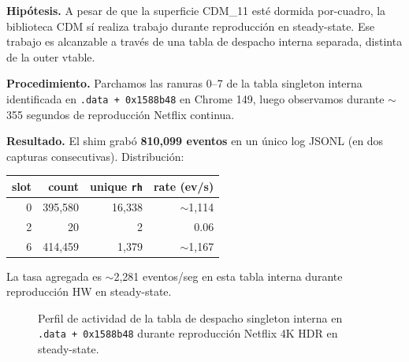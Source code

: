 \documentclass[11pt,letterpaper]{article}
\begin{document}
\textbf{Hipótesis.} A pesar de que la superficie CDM\_11 esté
dormida por-cuadro, la biblioteca CDM sí realiza trabajo durante
reproducción en steady-state. Ese trabajo es alcanzable a través
de una tabla de despacho interna separada, distinta de la outer
vtable.

\textbf{Procedimiento.} Parchamos las ranuras 0--7 de la tabla
singleton interna identificada en \texttt{.data + 0x1588b48} en
Chrome 149, luego observamos durante $\sim$355 segundos de
reproducción Netflix continua.

\textbf{Resultado.} El shim grabó \textbf{810{,}099 eventos} en un
único log JSONL (en dos capturas consecutivas). Distribución:

\begin{center}\small
\begin{tabular}{rrrr}
\toprule
\textbf{slot} & \textbf{count} & \textbf{unique \texttt{rh}} & \textbf{rate (ev/s)} \\
\midrule
0 & 395{,}580 & 16{,}338 & $\sim$1{,}114 \\
2 &     20    &  2     & 0.06 \\
6 & 414{,}459 & 1{,}379 & $\sim$1{,}167 \\
\bottomrule
\end{tabular}
\end{center}

\noindent La tasa agregada es $\sim$2{,}281 eventos/seg en esta
tabla interna durante reproducción HW en steady-state.

\begin{figure}[h]
\centering
{}
\caption{Perfil de actividad de la tabla de despacho singleton
interna en \texttt{.data + 0x1588b48} durante reproducción
Netflix 4K HDR en steady-state.}
\label{fig:singleton-rate}
\end{figure}
\end{document}
